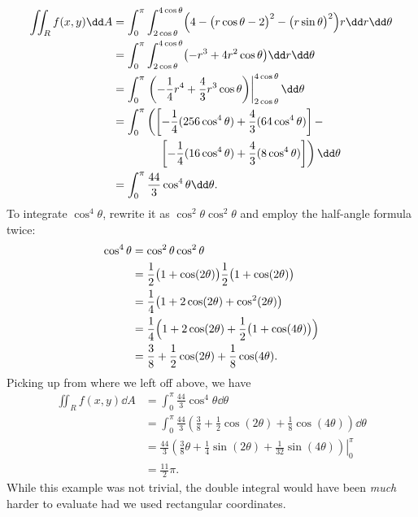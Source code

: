 \begin{example}
{\allowdisplaybreaks
\begin{align*}
\iint_Rf(x,y)\dd A
	&= \int_0^{\pi}\int_{2\cos\theta}^{4\cos\theta} \Bigl(4-\bigl(r\cos\theta-2\bigr)^2-\bigl(r\sin\theta\bigr)^2\Bigr)r\dd r\dd\theta\\
	&= \int_0^{\pi}\int_{2\cos\theta}^{4\cos\theta} \bigl(-r^3+4r^2\cos \theta\bigr)\dd r\dd\theta\\
	&= \int_0^\pi \left.\left(-\frac14r^4+\frac43r^3\cos\theta\right)\right|_{2\cos\theta}^{4\cos\theta}\dd\theta\\
	&=\int_0^\pi \left(\left[-\frac14(256\cos^4\theta)+\frac43(64\cos^4\theta)\right]-\right.\\
	&\qquad\qquad\left.\left[-\frac14(16\cos^4\theta)+\frac43(8\cos^4\theta)\right]\right)\dd\theta\\
	&=\int_0^\pi\frac{44}3\cos^4\theta\dd\theta.
\end{align*}}
To integrate $\cos^4\theta$, rewrite it as $\cos^2\theta\cos^2\theta$ and employ the half-angle formula twice:
\begin{align*}
	\cos^4\theta &=\cos^2\theta\cos^2\theta\\
	&= \frac12\bigl(1+\cos(2\theta)\bigr)\frac12\bigl(1+\cos(2\theta)\bigr) \\
	&= \frac14\bigl(1+2\cos(2\theta)+\cos^2(2\theta)\bigr)\\
	&=\frac14\Bigl(1+2\cos(2\theta)+\frac12\bigl(1+\cos(4\theta)\bigr)\Bigr)\\
	&= \frac38+\frac12\cos(2\theta)+\frac18\cos(4\theta).
\end{align*}
Picking up from where we left off above, we have
\begin{align*}
\iint_Rf(x,y)\dd A &=\int_0^\pi\frac{44}3\cos^4\theta\dd\theta\\
	&=\int_0^\pi \frac{44}3\left(\frac38+\frac12\cos(2\theta)+\frac18\cos(4\theta)\right)\dd\theta\\
	&= \left.\frac{44}3\left(\frac{3}8\theta+\frac14\sin(2\theta)+\frac{1}{32}\sin(4\theta)\right)\right|_0^\pi\\
	&=\frac{11}2\pi%
	.
\end{align*}
While this example was not trivial, the double integral would have been \emph{much} harder to evaluate had we used rectangular coordinates.
\end{example}

